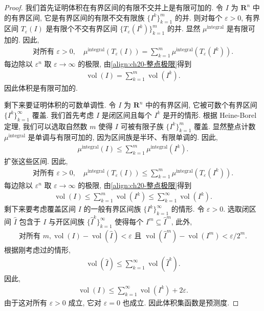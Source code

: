 \documentclass[../../main.tex]{subfiles}
\begin{document}
\begin{proof}
我们首先证明体积在有界区间的有限不交并上是有限可加的. 令 $I$ 为 $\mathbf{R}^{n}$ 中的有界区间, 它是有界区间的有限不交有限族 $\{I^{k}\}_{k=1}^{m}$ 的并. 则对每个 $\varepsilon>0$, 有界区间 $T_{\varepsilon}(I)$ 是有限个不交有界区间 $\{T_{\varepsilon}(I^{k})\}_{k=1}^{m}$ 的并. 显然 $\mu^{\operatorname{integral}}$ 是有限可加的. 因此,
\begin{align*}
\text{对所有 }\varepsilon>0,\quad\mu^{\operatorname{integral}}(T_{\varepsilon}(I))=\sum_{k=1}^{m}\mu^{\operatorname{integral}}(T_{\varepsilon}(I^{k})).
\end{align*}
每边除以 $\varepsilon^{n}$ 取 $\varepsilon\to\infty$ 的极限, 由\eqref{align:ch20-整点极限}得到
\begin{align*}
\operatorname{vol}(I)=\sum_{k=1}^{m}\operatorname{vol}(I^{k}).
\end{align*}
因此体积是有限可加的.

剩下来要证明体积的可数单调性. 令 $I$ 为 $\mathbf{R}^{n}$ 中的有界区间, 它被可数个有界区间 $\{I^{k}\}_{k=1}^{\infty}$ 覆盖. 我们首先考虑 $I$ 是闭区间且每个 $I^{k}$ 是开的情形. 根据 Heine-Borel 定理, 我们可以选取自然数 $m$ 使得 $I$ 可被有限子族 $\{I^{k}\}_{k=1}^{m}$ 覆盖. 显然整点计数 $\mu^{\operatorname{integral}}$ 是单调与有限可加的, 因为区间族是半环、有限单调的. 因此,
\begin{align*}
\mu^{\operatorname{integral}}(I)\leqslant\sum_{k=1}^{m}\mu^{\operatorname{integral}}(I^{k}).
\end{align*}
扩张这些区间. 因此,
\begin{align*}
\text{对所有 }\varepsilon>0,\quad\mu^{\operatorname{integral}}(T_{\varepsilon}(I))\leqslant\sum_{k=1}^{m}\mu^{\operatorname{integral}}(T_{\varepsilon}(I^{k})).
\end{align*}
每边除以 $\varepsilon^{n}$ 取 $\varepsilon\to\infty$ 的极限, 由\eqref{align:ch20-整点极限}得到
\begin{align*}
\operatorname{vol}(I)\leqslant\sum_{k=1}^{m}\operatorname{vol}(I^{k})\leqslant\sum_{k=1}^{\infty}\operatorname{vol}(I^{k}).
\end{align*}
剩下来要考虑覆盖区间 $I$ 的一般有界区间族 $\{I^{k}\}_{k=1}^{\infty}$ 的情形. 令 $\varepsilon>0$. 选取闭区间 $\widehat{I}$ 包含于 $I$ 与开区间族 $\{\widehat{I}^{k}\}_{k=1}^{\infty}$ 使得每个 $I^{m}\subseteq\widehat{I}^{m}$, 此外,
\begin{align*}
\text{对所有 }m,\operatorname{vol}(I)-\operatorname{vol}(\widehat{I})<\varepsilon\text{ 且 }\operatorname{vol}(\widehat{I}^{m})-\operatorname{vol}(I^{m})<\varepsilon/2^{m}.
\end{align*}
根据刚考虑过的情形,
\begin{align*}
\operatorname{vol}(\widehat{I})\leqslant\sum_{k=1}^{\infty}\operatorname{vol}(\widehat{I}^{k}).
\end{align*}
因此,
\begin{align*}
\operatorname{vol}(I)\leqslant\sum_{k=1}^{\infty}\operatorname{vol}(I^{k})+2\varepsilon.
\end{align*}
由于这对所有 $\varepsilon>0$ 成立, 它对 $\varepsilon=0$ 也成立. 因此体积集函数是预测度.
\end{proof}
\end{document}
